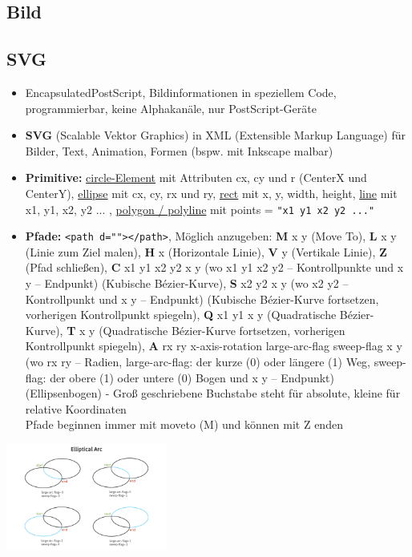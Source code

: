 \documentclass[12pt,landscape]{article}
\def\code#1{\texttt{#1}} %
\begin{document}
\begin{multicols}{3}
\section{Bild}
\subsection{SVG}
\begin{itemize}
\item EncapsulatedPostScript, Bildinformationen in speziellem Code, programmierbar, keine Alphakanäle, nur PostScript-Geräte
\item \textbf{SVG} (Scalable Vektor Graphics) in XML (Extensible Markup Language) für Bilder, Text, Animation, Formen (bspw. mit Inkscape malbar)
\item \textbf{Primitive:} \underline{circle-Element} mit Attributen cx, cy und r (CenterX und CenterY), \underline{ellipse} mit cx, cy, rx und ry, \underline{rect} mit x, y, width, height, \underline{line} mit x1, y1, x2, y2 ... , \underline{polygon / polyline} mit points = \code{"x1 y1 x2 y2 ..."}
\item \textbf{Pfade:} \lstinline|<path d=""></path>|, Möglich anzugeben: \textbf{M} x y (Move To), \textbf{L} x y (Linie zum Ziel malen), \textbf{H} x (Horizontale Linie), \textbf{V} y (Vertikale Linie), \textbf{Z} (Pfad schließen), \textbf{C} x1 y1 x2 y2 x y (wo x1 y1 x2 y2 -- Kontrollpunkte und x y -- Endpunkt) (Kubische Bézier-Kurve), \textbf{S} x2 y2 x y (wo x2 y2 -- Kontrollpunkt und x y -- Endpunkt) (Kubische Bézier-Kurve fortsetzen, vorherigen Kontrollpunkt spiegeln), \textbf{Q} x1 y1 x y (Quadratische Bézier-Kurve), \textbf{T} x y (Quadratische Bézier-Kurve fortsetzen, vorherigen Kontrollpunkt spiegeln), \textbf{A} rx ry x-axis-rotation large-arc-flag sweep-flag x y (wo rx ry -- Radien, large-arc-flag: der kurze (0) oder längere (1) Weg, sweep-flag: der obere (1) oder untere (0) Bogen und x y -- Endpunkt)  (Ellipsenbogen) - Groß geschriebene Buchstabe steht für absolute, kleine für relative Koordinaten\\Pfade beginnen immer mit moveto (M) und können mit Z enden
\end{itemize}
\begin{center}
\includegraphics[height=100pt]{svg-path.png}\\

\end{center}
\end{multicols}
\end{document}
